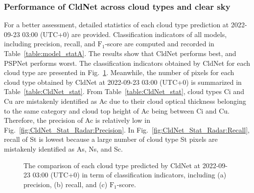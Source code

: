 \documentclass[review]{elsarticle}
\begin{document}
\subsubsection{Performance of CldNet across cloud types and clear sky} %
\label{section:Performance_of_CldNet_cloudtypes}
For a better assessment, detailed statistics of each cloud type prediction at 2022-09-23 03:00 (UTC+0) are provided.
Classification indicators of all models, including precision, recall, and $\mathrm{F_{1}}$-score are computed and recorded in Table~\ref{table:model_statA}.
The results show that CldNet performs best, and PSPNet performs worst.
The classification indicators obtained by CldNet for each cloud type are presented in Fig.~\ref{fig:CldNet_Stat_Radar}.
Meanwhile, the number of pixels for each cloud type obtained by CldNet at 2022-09-23 03:00 (UTC+0) is summarized in Table~\ref{table:CldNet_stat}.
From Table~\ref{table:CldNet_stat}, cloud types Ci and Cu are mistakenly identified as Ac due to their cloud optical thickness belonging to the same category and cloud top height of Ac being between Ci and Cu.
Therefore, the precision of Ac is relatively low in Fig.~\ref{fig:CldNet_Stat_Radar:Precision}.
In Fig.~\ref{fig:CldNet_Stat_Radar:Recall}, recall of St is lowest because a large number of cloud type St pixels are mistakenly identified as As, Ns, and Sc.

\begin{figure}[!htp]
    \vspace{5mm}
    \centering
    \hspace{3.5mm}
    \hspace{3.5mm}
    \caption{The comparison of each cloud type predicted by CldNet at 2022-09-23 03:00 (UTC+0) in term of classification indicators, including (a) precision, (b) recall, and (c) $\mathrm{F_{1}}$-score.}
    \label{fig:CldNet_Stat_Radar}
\end{figure}
\end{document}

